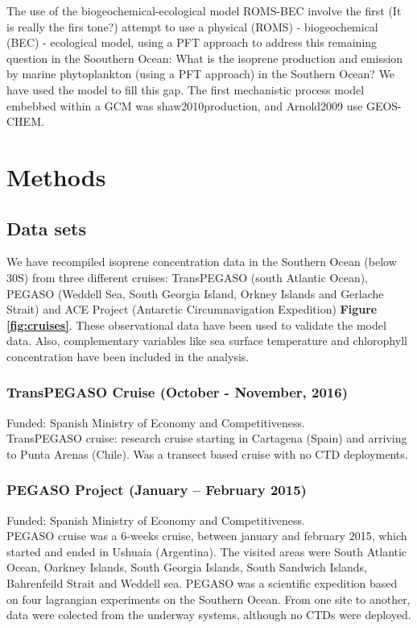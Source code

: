 \documentclass[draft,linenumbers]{agujournal}
\begin{document}
The use of the biogeochemical-ecological model ROMS-BEC involve the first (It is really the firs tone?) attempt to use a physical (ROMS) - biogeochemical (BEC) - ecological model, using a PFT approach to address this remaining question in the Soouthern Ocean: What is the isoprene production and emission by marine phytoplankton (using a PFT approach) in the Southern Ocean? We have used the model to fill this gap. The first mechanistic process model embebbed within a GCM was {shaw2010production}, and {Arnold2009} use GEOS-CHEM.



\section{Methods}

\subsection{Data sets}

We have recompiled isoprene concentration data in the Southern Ocean (below 30S) from three different cruises: TransPEGASO (south Atlantic Ocean), PEGASO (Weddell Sea, South Georgia Island, Orkney Islands and Gerlache Strait) and ACE Project (Antarctic Circumnavigation Expedition) \textbf{Figure \ref{fig:cruises}}. These observational data have been used to validate the model data. Also, complementary variables like sea surface temperature and chlorophyll concentration have been included in the analysis.\\

\subsubsection{TransPEGASO Cruise (October - November, 2016)}
Funded: Spanish Ministry of Economy and Competitiveness.\\
TransPEGASO cruise: research cruise starting in Cartagena (Spain) and arriving to Punta Arenas (Chile). Was a transect based cruise with no CTD deployments.\\

\subsubsection{PEGASO Project (January -- February 2015)}
Funded: Spanish Ministry of Economy and Competitiveness.\\
PEGASO cruise was a 6-weeks cruise, between january and february 2015, which started and ended in Ushuaia (Argentina).
The visited areas were South Atlantic Ocean, Oarkney Islands, South Georgia Islands, South Sandwich Islands, Bahrenfeild Strait and Weddell sea.
PEGASO was a scientific expedition based on four lagrangian experiments on the Southern Ocean.
From one site to another, data were colected from the underway systems, although no CTDs were deployed.\\
\end{document}
